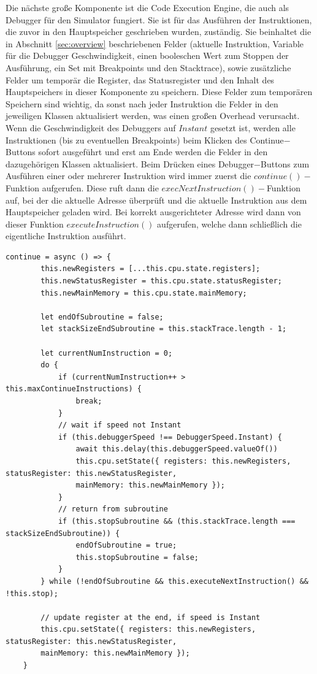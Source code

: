 \documentclass[a4paper, 11pt, onecolumn]{article}
\begin{document}
Die nächste große Komponente ist die Code Execution Engine, die auch als Debugger für den Simulator fungiert. Sie ist für das Ausführen der Instruktionen, die zuvor in den Hauptspeicher geschrieben wurden, zuständig. Sie beinhaltet die in Abschnitt \ref{sec:overview} beschriebenen Felder (aktuelle Instruktion, Variable für die Debugger Geschwindigkeit, einen booleschen Wert zum Stoppen der Ausführung, ein Set mit Breakpoints und den Stacktrace), sowie zusätzliche Felder um temporär die Register, das Statusregister und den Inhalt des Hauptspeichers in dieser Komponente zu speichern. Diese Felder zum temporären Speichern sind wichtig, da sonst nach jeder Instruktion die Felder in den jeweiligen Klassen aktualisiert werden, was einen großen Overhead verursacht. Wenn die Geschwindigkeit des Debuggers auf $Instant$ gesetzt ist, werden alle Instruktionen (bis zu eventuellen Breakpoints) beim Klicken des Continue$-$Buttons sofort ausgeführt und erst am Ende werden die Felder in den dazugehörigen Klassen aktualisiert. Beim Drücken eines Debugger$-$Buttons zum Ausführen einer oder mehrerer Instruktion wird immer zuerst die $continue()-$Funktion aufgerufen. Diese ruft dann die  $execNextInstruction()-$Funktion auf, bei der die aktuelle Adresse überprüft und die aktuelle Instruktion aus dem Hauptspeicher geladen wird. Bei korrekt ausgerichteter Adresse wird dann von dieser Funktion $executeInstruction()$ aufgerufen, welche dann schließlich die eigentliche Instruktion ausführt. 
\newpage
\begin{lstlisting}[style=JavaScript, basicstyle=\footnotesize, backgroundcolor=\color{backcolour}, caption={Continue$-$Funktion der Code Execution Engine}, captionpos=b, label={lst:continue}]
continue = async () => {
        this.newRegisters = [...this.cpu.state.registers];
        this.newStatusRegister = this.cpu.state.statusRegister;
        this.newMainMemory = this.cpu.state.mainMemory;

        let endOfSubroutine = false;
        let stackSizeEndSubroutine = this.stackTrace.length - 1;

        let currentNumInstruction = 0;
        do {
            if (currentNumInstruction++ > this.maxContinueInstructions) {
                break;
            }
            // wait if speed not Instant
            if (this.debuggerSpeed !== DebuggerSpeed.Instant) {
                await this.delay(this.debuggerSpeed.valueOf())
                this.cpu.setState({ registers: this.newRegisters, statusRegister: this.newStatusRegister,
                mainMemory: this.newMainMemory });
            }
            // return from subroutine
            if (this.stopSubroutine && (this.stackTrace.length === stackSizeEndSubroutine)) {
                endOfSubroutine = true;
                this.stopSubroutine = false;
            }
        } while (!endOfSubroutine && this.executeNextInstruction() && !this.stop);

        // update register at the end, if speed is Instant
        this.cpu.setState({ registers: this.newRegisters, statusRegister: this.newStatusRegister,
        mainMemory: this.newMainMemory });
    }      	 
\end{lstlisting}
\noindent
\end{document}
